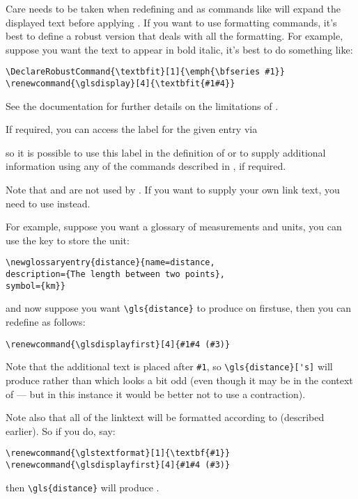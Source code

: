 \documentclass{nlctdoc}
\newcommand*{\firstuse}{\gls{firstuse}}
\newcommand*{\gloskey}[2][newglossaryentry]{\csopt{#1}{#2}}
\begin{document}
\begin{important}
Care needs to be taken when redefining  and
 as commands like  will expand the
displayed text before applying . If you want to use
formatting commands, it's best to define a robust version that deals
with all the formatting. For example, suppose you want
the text to appear in bold italic, it's best to do something like:
\begin{verbatim}
\DeclareRobustCommand{\textbfit}[1]{\emph{\bfseries #1}}
\renewcommand{\glsdisplay}[4]{\textbfit{#1#4}}
\end{verbatim}
See the  documentation for further details on the
limitations of .
\end{important}

If required, you can access the label for the given entry via
\begin{definition}[\DescribeMacro{\glslabel}]
\end{definition}
so it is possible to use this label in the definition of
 or  to supply additional
information using any of the commands described in
, if required.

Note that  and  are not used
by . If you want to supply your own link text, you
need to use  instead.

For example, suppose you want a glossary of measurements and
units, you can use the \gloskey{symbol} key to store the unit:
\begin{verbatim}
\newglossaryentry{distance}{name=distance,
description={The length between two points},
symbol={km}}
\end{verbatim}
and now suppose you want \verb|\gls{distance}| to produce
 on \firstuse, then you can redefine
 as follows:
\begin{verbatim}
\renewcommand{\glsdisplayfirst}[4]{#1#4 (#3)}
\end{verbatim}
Note that the additional text is placed after \verb|#1|, so
\verb|\gls{distance}['s]| will produce 
rather than  which looks a bit odd (even though
it may be in the context of  --- but in this instance it would be better not to
use a contraction).

Note also that all of the \gls{linktext} will be formatted according
to  (described earlier). So if you do, say:
\begin{verbatim}
\renewcommand{\glstextformat}[1]{\textbf{#1}}
\renewcommand{\glsdisplayfirst}[4]{#1#4 (#3)}
\end{verbatim}
then \verb|\gls{distance}| will produce .
\end{document}
